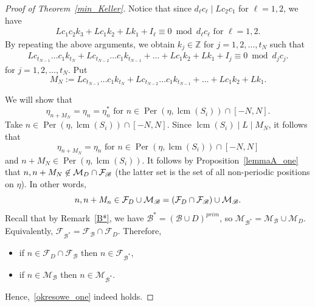 \documentclass[leqno,a4paper,12pt]{article}
\DeclareMathOperator{\lcm}{lcm}
\theoremstyle{definition}
\newcommand{\divides}{\mid}
\newcommand{\Per}{\operatorname{Per}\nolimits}
\newcommand{\cf}{{\cal F}}
\newcommand{\cm}{{\cal M}}
\newcommand{\Z}{{\mathbb{Z}}}
\newcommand{\sB}{\mathscr{B}}
\begin{document}
\begin{proof}[Proof of Theorem~\ref{min_Keller}]
Notice that since $d_\ell c_\ell\mid Lc_2c_1$ for $\ell=1,2$, we have
\begin{align*}
Lc_1c_2k_3+Lc_1k_2+Lk_1+I_\ell\equiv0 \bmod d_\ell c_\ell\text{ for }\ell=1,2.
\end{align*}
By repeating the above arguments, we obtain $k_j\in\Z$ for $j=1,2,\ldots,t_N$ such that
\begin{align}\label{kok_one}
Lc_{t_{N-1}}\ldots c_1k_{t_N}+Lc_{t_{N-2}}\ldots c_1k_{t_{N-1}}+\ldots+Lc_1k_2+Lk_1+I_j\equiv0 \bmod d_j c_j.
\end{align}
for $j=1,2,\ldots,t_N$. Put
\[
M_N:=Lc_{t_{N-1}}\ldots c_1k_{t_N}+Lc_{t_{N-2}}\ldots c_1k_{t_{N-1}}+\ldots+Lc_1k_2+Lk_1.
\]

We will show that
\begin{equation}\label{okresowe_one}
\eta_{n+M_N}=\eta_n=\eta^*_n \text{ for }n\in\Per(\eta,\lcm(S_i))\cap [-N,N].
\end{equation}
Take $n\in\Per(\eta,\lcm(S_i))\cap [-N,N]$. Since  $\lcm(S_i)\divides L \divides M_N$, it follows that
\begin{equation}\label{AA}
\eta_{n+M_N}=\eta_n \text{ for }n\in\Per(\eta,\lcm(S_i))\cap [-N,N]
\end{equation}
and $n+M_N\in \Per(\eta,\lcm(S_i))$. It follows by Proposition~\ref{lemmaA_one} that $n,n+M_N\not\in \cm_D\cap\cf_\sB$ (the latter set is the set of all non-periodic positions on $\eta$). In other words,
\begin{equation*}
n,n+M_n\in \mathcal{F}_D \cup \cm_\sB=(\mathcal{F}_D\cap \mathcal{F}_{\sB})\cup \mathcal{M}_{\sB}.
\end{equation*}
Recall that by Remark~\ref{B*}, we have $\sB^*=(\sB\cup D)^{prim}$, so $\mathcal{M}_{\sB^*}=\mathcal{M}_{\sB}\cup\mathcal{M}_{D}$. Equivalently, $\mathcal{F}_{\sB^*}=\mathcal{F}_{\sB}\cap\mathcal{F}_D$.
Therefore,
\begin{itemize}
\item
if $n\in \mathcal{F}_D\cap \mathcal{F}_\sB$ then $n\in\mathcal{F}_{\sB^*}$,
\item
if $n\in\mathcal{M}_{\sB}$ then $n\in\mathcal{M}_{\sB^*}$.
\end{itemize}
Hence,~\eqref{okresowe_one} indeed holds.


\end{proof}
\end{document}
